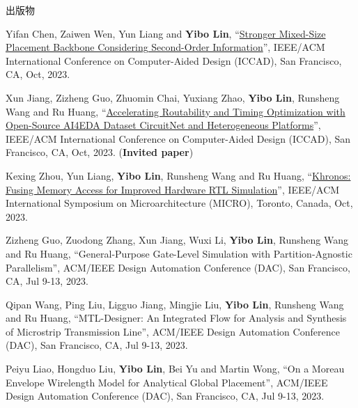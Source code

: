 \begin{rSection}{出版物}
\begin{description}[font=\normalfont, rightmargin=2em]
\item[{[C85]}]{
        Yifan Chen, Zaiwen Wen, Yun Liang and \textbf{Yibo Lin}, 
    ``\href{https://doi.org/10.1109/ICCAD57390.2023.10323700}{Stronger Mixed-Size Placement Backbone Considering Second-Order Information}'', 
    IEEE/ACM International Conference on Computer-Aided Design (ICCAD), San Francisco, CA, Oct, 2023.
    
}
            

\item[{[C84]}]{
        Xun Jiang, Zizheng Guo, Zhuomin Chai, Yuxiang Zhao, \textbf{Yibo Lin}, Runsheng Wang and Ru Huang, 
    ``\href{https://doi.org/10.1109/ICCAD57390.2023.10323938}{Accelerating Routability and Timing Optimization with Open-Source AI4EDA Dataset CircuitNet and Heterogeneous Platforms}'', 
    IEEE/ACM International Conference on Computer-Aided Design (ICCAD), San Francisco, CA, Oct, 2023.
    (\textbf{Invited paper})
}
            

\item[{[C83]}]{
        Kexing Zhou, Yun Liang, \textbf{Yibo Lin}, Runsheng Wang and Ru Huang, 
    ``\href{https://doi.org/10.1145/3613424.3614301}{Khronos: Fusing Memory Access for Improved Hardware RTL Simulation}'', 
    IEEE/ACM International Symposium on Microarchitecture (MICRO), Toronto, Canada, Oct, 2023.
    
}
            

\item[{[C82]}]{
        Zizheng Guo, Zuodong Zhang, Xun Jiang, Wuxi Li, \textbf{Yibo Lin}, Runsheng Wang and Ru Huang, 
    ``General-Purpose Gate-Level Simulation with Partition-Agnostic Parallelism'', 
    ACM/IEEE Design Automation Conference (DAC), San Francisco, CA, Jul 9-13, 2023.
    
}
            

\item[{[C81]}]{
        Qipan Wang, Ping Liu, Ligguo Jiang, Mingjie Liu, \textbf{Yibo Lin}, Runsheng Wang and Ru Huang, 
    ``MTL-Designer: An Integrated Flow for Analysis and Synthesis of Microstrip Transmission Line'', 
    ACM/IEEE Design Automation Conference (DAC), San Francisco, CA, Jul 9-13, 2023.
    
}
            

\item[{[C80]}]{
        Peiyu Liao, Hongduo Liu, \textbf{Yibo Lin}, Bei Yu and Martin Wong, 
    ``On a Moreau Envelope Wirelength Model for Analytical Global Placement'', 
    ACM/IEEE Design Automation Conference (DAC), San Francisco, CA, Jul 9-13, 2023.
    
}
\end{description}
\end{rSection}
